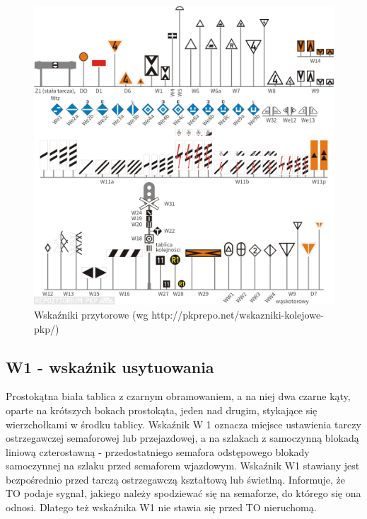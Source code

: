 \begin{center}
	\begin{figure}
		\includegraphics[width=16cm]{skryptkierownik-img/skryptkierownik-img003.png}
		\caption{Wskaźniki przytorowe (wg http://pkprepo.net/wskazniki-kolejowe-pkp/)}
		\label{fig:wskazniki}
	\end{figure}
\end{center}

\subsection{W1 - wskaźnik usytuowania}

Prostokątna biała tablica z czarnym obramowaniem, a na niej dwa czarne kąty, oparte na krótszych bokach prostokąta, jeden nad drugim, stykające się wierzchołkami w środku tablicy. Wskaźnik W 1 oznacza miejsce ustawienia tarczy ostrzegawczej semaforowej lub przejazdowej, a na szlakach z samoczynną blokadą liniową czterostawną - przedostatniego
semafora odstępowego blokady samoczynnej na szlaku przed semaforem wjazdowym. Wskaźnik W1 stawiany jest bezpośrednio przed tarczą ostrzegawczą kształtową lub świetlną. Informuje, że TO podaje sygnał, jakiego należy spodziewać się na semaforze, do którego się ona odnosi. Dlatego też wskaźnika W1 nie stawia się przed TO nieruchomą.

